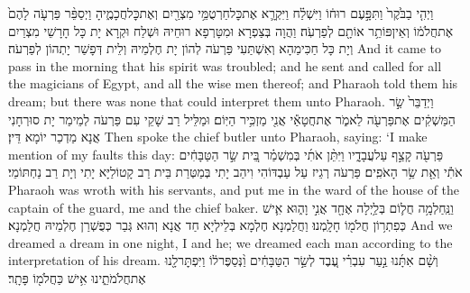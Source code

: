 {וַיְהִ֤י בַבֹּ֙קֶר֙ וַתִּפָּ֣עֶם רוּח֔וֹ וַיִּשְׁלַ֗ח וַיִּקְרָ֛א אֶת\maqqaf כׇּל\maqqaf חַרְטֻמֵּ֥י מִצְרַ֖יִם וְאֶת\maqqaf כׇּל\maqqaf חֲכָמֶ֑יהָ וַיְסַפֵּ֨ר פַּרְעֹ֤ה לָהֶם֙ אֶת\maqqaf חֲלֹמ֔וֹ וְאֵין\maqqaf פּוֹתֵ֥ר אוֹתָ֖ם לְפַרְעֹֽה׃}
{וַהֲוָה בְּצַפְרָא וּמִטָּרְפָא רוּחֵיהּ וּשְׁלַח וּקְרָא יָת כָּל חָרָשֵׁי מִצְרַיִם וְיָת כָּל חַכִּימַהָא וְאִשְׁתַּעִי פַּרְעֹה לְהוֹן יָת חֶלְמֵיהּ וְלֵית דְּפָשַׁר יָתְהוֹן לְפַרְעֹה׃}
{And it came to pass in the morning that his spirit was troubled; and he sent and called for all the magicians of Egypt, and all the wise men thereof; and Pharaoh told them his dream; but there was none that could interpret them unto Pharaoh.}{}
{וַיְדַבֵּר֙ שַׂ֣ר הַמַּשְׁקִ֔ים אֶת\maqqaf פַּרְעֹ֖ה לֵאמֹ֑ר אֶת\maqqaf חֲטָאַ֕י אֲנִ֖י מַזְכִּ֥יר הַיּֽוֹם׃}
{וּמַלֵּיל רַב שָׁקֵי עִם פַּרְעֹה לְמֵימַר יָת סוּרְחָנִי אֲנָא מַדְכַר יוֹמָא דֵּין׃}
{Then spoke the chief butler unto Pharaoh, saying: ‘I make mention of my faults this day:}{}
{פַּרְעֹ֖ה קָצַ֣ף עַל\maqqaf עֲבָדָ֑יו וַיִּתֵּ֨ן אֹתִ֜י בְּמִשְׁמַ֗ר בֵּ֚ית שַׂ֣ר הַטַּבָּחִ֔ים אֹתִ֕י וְאֵ֖ת שַׂ֥ר הָאֹפִֽים׃}
{פַּרְעֹה רְגֵיז עַל עַבְדּוֹהִי וִיהַב יָתִי בְּמַטְּרַת בֵּית רַב קָטוֹלַיָּא יָתִי וְיָת רַב נַחְתּוֹמֵי׃}
{Pharaoh was wroth with his servants, and put me in the ward of the house of the captain of the guard, me and the chief baker.}{}
{וַנַּֽחַלְמָ֥ה חֲל֛וֹם בְּלַ֥יְלָה אֶחָ֖ד אֲנִ֣י וָה֑וּא אִ֛ישׁ כְּפִתְר֥וֹן חֲלֹמ֖וֹ חָלָֽמְנוּ׃}
{וַחֲלַמְנָא חֶלְמָא בְּלֵילְיָא חַד אֲנָא וְהוּא גְּבַר כְּפֻשְׁרַן חֶלְמֵיהּ חֲלַמְנָא׃}
{And we dreamed a dream in one night, I and he; we dreamed each man according to the interpretation of his dream.}{}
{וְשָׁ֨ם אִתָּ֜נוּ נַ֣עַר עִבְרִ֗י עֶ֚בֶד לְשַׂ֣ר הַטַּבָּחִ֔ים וַ֨נְּסַפֶּר\maqqaf ל֔וֹ וַיִּפְתׇּר\maqqaf לָ֖נוּ אֶת\maqqaf חֲלֹמֹתֵ֑ינוּ אִ֥ישׁ כַּחֲלֹמ֖וֹ פָּתָֽר׃}

